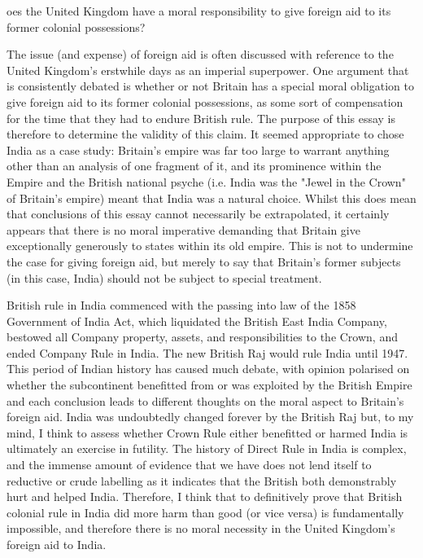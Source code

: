 \label{ch:the-moral-responsibility-in-foreign-aid}

{\flushright{}}

\smallskip

oes the United Kingdom have a moral responsibility to give foreign aid to
its former colonial possessions?

   The issue (and expense) of foreign aid is often discussed with
   reference to the United Kingdom's erstwhile days as an imperial
   superpower.  One argument that is consistently debated is whether or
   not Britain has a special moral obligation to give foreign aid to its
   former colonial possessions, as some sort of compensation for the time
   that they had to endure British rule. The purpose of this essay is
   therefore to determine the validity of this claim. It seemed
   appropriate to chose India as a case study: Britain's empire was far
   too large to warrant anything other than an analysis of one fragment of
   it, and its prominence within the Empire and the British national
   psyche (i.e. India was the "Jewel in the Crown" of Britain's empire)
   meant that India was a natural choice.  Whilst this does mean that
   conclusions of this essay cannot necessarily be extrapolated, it
   certainly appears that there is no moral imperative demanding that
   Britain give exceptionally generously to states within its old empire.
   This is not to undermine the case for giving foreign aid, but merely to
   say that Britain's former subjects (in this case, India) should not be
   subject to special treatment.

   British rule in India commenced with the passing into law of the 1858
   Government of India Act, which liquidated the British East India
   Company, bestowed all Company property, assets, and responsibilities to
   the Crown, and ended Company Rule in India. The new British Raj would
   rule India until 1947. This period of Indian history has caused much
   debate, with opinion polarised on whether the subcontinent benefitted
   from or was exploited by the British Empire and each conclusion leads
   to different thoughts on the moral aspect to Britain's foreign aid.
   India was undoubtedly changed forever by the British Raj but, to my
   mind, I think to assess whether Crown Rule either benefitted or harmed
   India is ultimately an exercise in futility. The history of Direct Rule
   in India is complex, and the immense amount of evidence that we have
   does not lend itself to reductive or crude labelling as it indicates
   that the British both demonstrably hurt and helped India. Therefore, I
   think that to definitively prove that British colonial rule in India
   did more harm than good (or vice versa) is fundamentally impossible,
   and therefore there is no moral necessity in the United Kingdom's
   foreign aid to India.

